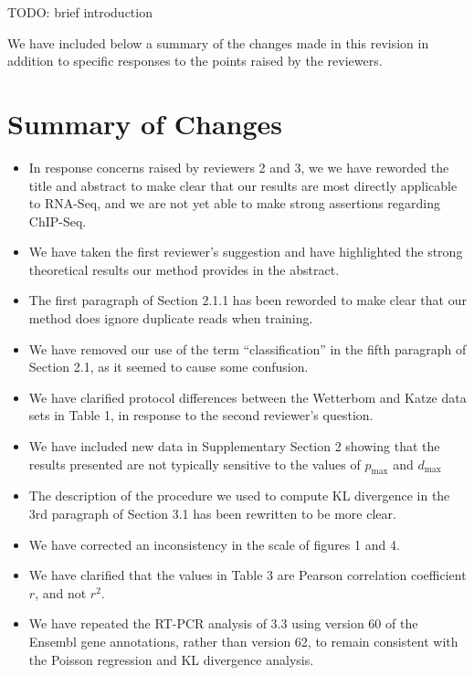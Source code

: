 \documentclass{article}
\begin{document}
TODO: brief introduction

We have included below a summary of the changes made in this revision in
addition to specific responses to the points raised by the reviewers.


\section*{Summary of Changes}

\begin{itemize}
\item In response concerns raised by reviewers 2 and 3, we we have reworded the
title and abstract to make clear that our results are most directly applicable
to RNA-Seq, and we are not yet able to make strong assertions regarding
ChIP-Seq.

\item We have taken the first reviewer's suggestion and have highlighted the
strong theoretical results our method provides in the abstract.

\item The first paragraph of Section 2.1.1 has been reworded to make clear that
our method does ignore duplicate reads when training.

\item We have removed our use of the term ``classification'' in the fifth
paragraph of Section 2.1, as it seemed to cause some confusion.

\item We have clarified protocol differences between the Wetterbom and Katze
data sets in Table 1, in response to the second reviewer's question.

\item We have included new data in Supplementary Section 2 showing that the
results presented are not typically sensitive to the values of $p_{\text{max}}$
and $d_{\text{max}}$

\item The description of the procedure we used to compute KL divergence in the
3rd paragraph of Section 3.1 has been rewritten to be more clear.

\item We have corrected an inconsistency in the scale of figures 1 and 4.

\item We have clarified that the values in Table 3 are Pearson correlation
coefficient $r$, and not $r^2$.

\item We have repeated the RT-PCR analysis of 3.3 using version 60 of the
Ensembl gene annotations, rather than version 62, to remain consistent with the
Poisson regression and KL divergence analysis.


\end{itemize}
\end{document}
